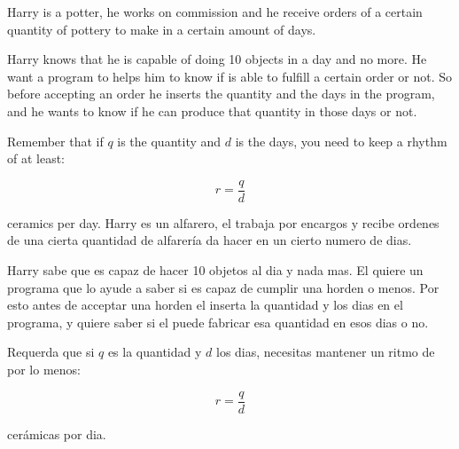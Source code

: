 



\ExamNameLine
\ExamStandardBoxEn
Harry is a potter, he works on commission and he receive orders of
a certain quantity of pottery to make in a certain amount of
days.

Harry knows that he is capable of doing 10 objects in a day and
no more. He want a program to helps him to know if is able to
fulfill a certain order or not. So before accepting an order he inserts
the quantity and the days in the program, and he wants to know if he
can produce that quantity in those days or not.

Remember that if $q$ is the quantity and $d$ is the days, you need to
keep a rhythm of at least:
\begin{center}
  \begin{equation*}
    r = \frac{q}{d}
  \end{equation*}
\end{center}
ceramics per day.
\newpage
\ExamNameLine
\ExamStandardBoxEs
Harry es un alfarero, el trabaja por encargos y recibe ordenes de una
cierta quantidad de alfarer\'ia da hacer en un cierto numero de dias.

Harry sabe que es capaz de hacer 10 objetos al dia y nada mas. El
quiere un programa que lo ayude a saber si es capaz de cumplir una
horden o menos. Por esto antes de acceptar una horden el inserta la
quantidad y los dias en el programa, y quiere saber si el puede
fabricar esa quantidad en esos dias o no.

Requerda que si $q$ es la quantidad y $d$ los dias, necesitas mantener
un ritmo de por lo menos:
\begin{center}
  \begin{equation*}
    r = \frac{q}{d}
  \end{equation*}
\end{center}
cer\'amicas por dia.


